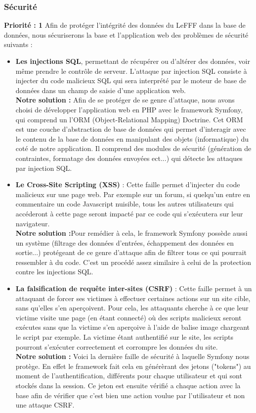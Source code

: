 \documentclass[12pt,a4paper]{article}
\begin{document}
\subsubsection{Sécurité}
\textbf{Priorité : 1}
\smallbreak
Afin de protéger l'intégrité des données du LeFFF dans la base de données, nous sécuriserons la base et l'application web des problèmes de sécurité suivants :
\begin{itemize}
    \item \textbf{Les injections SQL}, permettant de récupérer ou d'altérer des données, voir même prendre le contrôle de serveur. L'attaque par injection SQL consiste à injecter du code malicieux SQL qui sera interprété par le moteur de base de données dans un champ de saisie d'une application web. \\
    \textbf{Notre solution :} Afin de se protéger de se genre d'attaque, nous avons choisi de développer l'application web en PHP avec le framework Symfony, qui comprend un l'ORM (Object-Relational Mapping) Doctrine. Cet ORM est une couche d'abstraction de base de données qui permet d'interagir avec le contenu de la base de données en manipulant des objets (informatique) du coté de notre application. Il comprend des modules de sécurité (génération de contraintes, formatage des données envoyées ect...) qui détecte les attaques par injection SQL.
    
    \item \textbf{Le Cross-Site Scripting (XSS)} : Cette faille permet d'injecter du code malicieux sur une page web. Par exemple sur un forum, si quelqu'un entre en commentaire un code Javascript nuisible, tous les autres utilisateurs qui accéderont à cette page seront impacté par ce code qui s'exécutera sur leur navigateur. \\
    \textbf{Notre solution :}Pour remédier à cela, le framework Symfony possède aussi un système (filtrage des données d'entrées, échappement des données en sortie...) protégeant de ce genre d'attaque afin de filtrer tous ce qui pourrait ressembler à du code. C'est un procédé assez similaire à celui de la protection contre les injections SQL.
    
    \item \textbf{La falsification de requête inter-sites (CSRF)} : Cette faille permet à un attaquant de forcer ses victimes à effectuer certaines actions sur un site cible, sans qu’elles s’en aperçoivent. Pour cela, les attaquants cherche à ce que leur victime visite une page (en étant connecté) où des scripts malicieux seront exécutes sans que la victime s'en aperçoive à l'aide de balise image chargeant le script par exemple. La victime étant authentifié sur le site, les scripts pourront s'exécuter correctement et corrompre les données du site. \\
    \textbf{Notre solution :} Voici la dernière faille de sécurité à laquelle Symfony nous protège. En effet le framework fait cela en générèrant des jetons ("tokens") au moment de l'authentification, différents pour chaque utilisateur et qui sont stockés dans la session. Ce jeton est ensuite vérifié a chaque action avec la base afin de vérifier que c'est bien une action voulue par l'utilisateur et non une attaque CSRF. 
    

\end{itemize}
\end{document}

